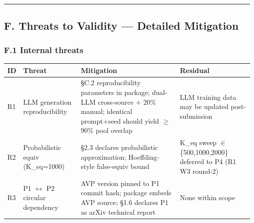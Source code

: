\documentclass[review,12pt,authoryear]{elsarticle}
\newcounter{none}                   %
\begin{document}
\begin{center}\rule{0.5\linewidth}{0.5pt}\end{center}

\subsection{F. Threats to Validity --- Detailed
Mitigation}\label{f.-threats-to-validity-detailed-mitigation}

\subsubsection{F.1 Internal threats}\label{f.1-internal-threats}

{\def\LTcaptype{none} %
\begin{longtable}[]{@{}
  >{\raggedright\arraybackslash}p{}
  >{\raggedright\arraybackslash}p{}
  >{\raggedright\arraybackslash}p{}
  >{\raggedright\arraybackslash}p{}@{}}
\toprule\noalign{}
\begin{minipage}[b]{\linewidth}\raggedright
ID
\end{minipage} & \begin{minipage}[b]{\linewidth}\raggedright
Threat
\end{minipage} & \begin{minipage}[b]{\linewidth}\raggedright
Mitigation
\end{minipage} & \begin{minipage}[b]{\linewidth}\raggedright
Residual
\end{minipage} \\
\midrule\noalign{}
\endhead
\bottomrule\noalign{}
\endlastfoot
R1 & LLM generation reproducibility & §C.2 reproducibility parameters in
package; dual-LLM cross-source + 20\% manual; identical prompt+seed
should yield $\geq$ 90\% pool overlap & LLM training data may be updated
post-submission \\
R2 & Probabilistic equiv (K\_eq=1000) & §2.3 declares probabilistic
approximation; Hoeffding-style false-equiv bound & K\_eq sweep $\in$
\{500,1000,2000\} deferred to P4 (R1 W3 round-2) \\
R3 & P1 $\leftrightarrow$ P2 circular dependency & AVP version pinned to P1 commit hash;
package embeds AVP source; §1.6 declares P1 as arXiv technical report &
None within scope \\

\end{longtable}}
\end{document}
